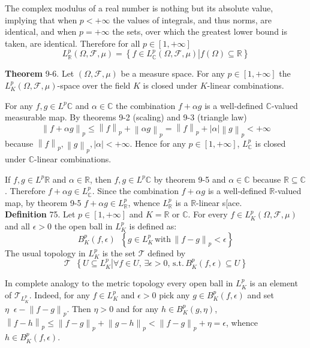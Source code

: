 \documentclass[a4paper]{article}
\newcommand{\obj}[1]{\left\{ #1 \right \}}
\newcommand{\clo}[1]{\left [ #1 \right ]}
\newcommand{\brac}[1]{\left ( #1 \right )}
\newcommand{\induc}[1]{\left . #1 \right \vert}
\newcommand{\abs}[1]{\left | #1 \right |}
\newcommand{\nrm}[1]{\left\| #1 \right \|}
\newcommand{\Real}{\mathbb{R}}
\newcommand{\Cplx}{\mathbb{C}}
\newcommand{\Tcal}{\mathcal{T}}
\newcommand{\Fcal}{\mathcal{F}}
\newcommand{\defn}{\mathop{\overset{\Delta}{=}}\nolimits}
\begin{document}
The complex modulus of a real number is nothing but its absolute value, implying that when $p<+\infty$ the values of integrals, and thus norms, are identical, and when $p=+\infty$ the sets, over which the greatest lower bound is taken, are identical. Therefore for all $p\in \clo{1, +\infty}$ \[L^p_\Real\brac{\Omega, \Fcal, \mu} = \obj{ \induc{ f\in L^p_\Cplx\brac{\Omega, \Fcal, \mu} } f\brac{\Omega}\subseteq \Real }\]

\label{thm:l_p_space_linear} \noindent \textbf{Theorem} 9-6.
Let $\brac{\Omega, \Fcal, \mu}$ be a measure space. For any $p\in \clo{1,+\infty}$ the $L^p_K\brac{\Omega, \Fcal, \mu}$-space over the field $K$ is closed under $K$-linear combinations.

For any $f, g\in L^p\Cplx$ and $\alpha\in \Cplx$ the combination $f + \alpha g$ is a well-defined $\Cplx$-valued measurable map. By theorems 9-2 (scaling) and 9-3 (triangle law) \[\nrm{f+\alpha g}_p\leq \nrm{f}_p+\nrm{\alpha g}_p = \nrm{f}_p + \abs{\alpha} \nrm{g}_p < +\infty \] because $\nrm{f}_p,\nrm{g}_p, \abs{\alpha}<+\infty$. Hence for any $p\in \clo{1,+\infty}$, $L^p_\Cplx$ is closed under $\Cplx$-linear combinations.

If $f, g\in L^p\Real$ and $\alpha\in \Real$, then $f, g\in L^p\Cplx$ by theorem 9-5 and $\alpha\in \Cplx$ because $\Real\subseteq \Cplx$. Therefore $f+\alpha g\in L^p_\Cplx$. Since the combination $f + \alpha g$ is a well-defined $\Real$-valued map, by theorem 9-5 $f + \alpha g\in L^p_\Real$, whence $L^p_\Real$ is a $\Real$-linear s[ace.\\

\noindent \textbf{Definition} 75.
Let $p\in \clo{1, +\infty}$ and $K=\Real$ or $\Cplx$. For every $f\in L^p_K\brac{\Omega, \Fcal, \mu}$ and all $\epsilon>0$ the open ball in $L^p_K$ is defined as: \[B^p_K\brac{f, \epsilon}\defn \obj{ g\in L^p_K\,\text{with}\,\nrm{f-g}_p < \epsilon }\] The usual topology in $L^p_K$ is the set $\Tcal$ defined by \[\Tcal\defn \obj{ \induc{ U\subseteq L^p_K } \forall f\in U,\, \exists \epsilon>0,\,\text{s.t.}\, B^p_K\brac{f, \epsilon}\subseteq U } \]

In complete analogy to the metric topology every open ball in $L^p_K$ is an element of $\Tcal_{L^p_K}$. Indeed, for any $f\in L^p_K$ and $\epsilon>0$ pick any $g\in B^p_K\brac{f,\epsilon}$ and set $\eta \defn \epsilon-\nrm{f-g}_p$. Then $\eta>0$ and for any $h\in B^p_K\brac{g,\eta}$, $\nrm{f-h}_p\leq \nrm{f-g}_p+\nrm{g-h}_p<\nrm{f-g}_p+\eta=\epsilon$, whence $h\in B^p_K\brac{f,\epsilon}$.
\end{document}
